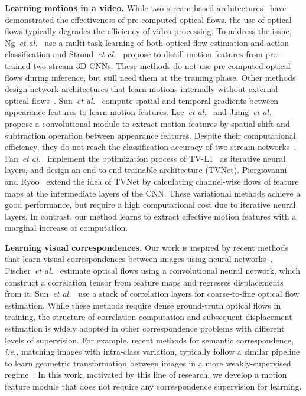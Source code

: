 \documentclass[runningheads]{llncs}
\def\ie{\emph{i.e.}}
\begin{document}
\smallbreak
\noindent
\textbf{Learning motions in a video.}
While two-stream-based architectures~\cite{simonyan2014two,feichtenhofer2016convolutional,feichtenhofer2016spatiotemporal,sevilla2018integration} have demonstrated the effectiveness of pre-computed optical flows, the use of optical flows typically degrades the efficiency of video processing.
To address the issue, Ng~\emph{et al.}~\cite{ng2018actionflownet} use a multi-task learning of both optical flow estimation and action classification and Stroud~\emph{et al.}~\cite{stroud2020d3d} propose to distill motion features from pre-trained two-stream 3D CNNs.
These methods do not use pre-computed optical flows during inference, but still need them at the training phase.
Other methods design network architectures that learn motions internally without external optical flows~\cite{sun2018optical,jiang2019stm,lee2018motion,fan2018end,piergiovanni2019representation}.
Sun~\emph{et al.}~\cite{sun2018optical} compute spatial and temporal gradients between appearance features to learn motion features.
Lee~\emph{et al.}~\cite{lee2018motion} and Jiang~\emph{et al.}~\cite{jiang2019stm} propose a convolutional module to extract motion features by spatial shift and subtraction operation between appearance features.
Despite their computational efficiency, they do not reach the classification accuracy of two-stream networks~\cite{simonyan2014two}.
Fan~\emph{et al.}~\cite{fan2018end} implement the optimization process of TV-L1~\cite{zach2007duality} as iterative neural layers, and design an end-to-end trainable architecture (TVNet).
Piergiovanni and Ryoo~\cite{piergiovanni2019representation} extend the idea of TVNet by calculating channel-wise flows of feature maps at the intermediate layers of the CNN.
These variational methods achieve a good performance, but require a high computational cost due to iterative neural layers.
In contrast, our method learns to extract effective motion features with a marginal increase of computation.

\smallbreak
\noindent
\textbf{Learning visual correspondences.}
Our work is inspired by recent methods that learn visual correspondences between images using neural networks~\cite{han2017scnet,dosovitskiy2015flownet,rocco2017convolutional,min2019hyperpixel,lee2019sfnet,sun2018pwc}.
Fischer~\emph{et al.}~\cite{dosovitskiy2015flownet} estimate optical flows using a convolutional neural network, which construct a correlation tensor from feature maps and regresses displacements from it. Sun~\emph{et al.}~\cite{sun2018pwc} use a stack of correlation layers for coarse-to-fine optical flow estimation.
While these methods require dense ground-truth optical flows in training, 
the structure of correlation computation and subsequent displacement estimation is widely adopted in other correspondence problems with different levels of supervision. For example, recent methods for semantic correspondence, \ie, matching images with intra-class variation, typically follow a similar pipeline to learn geometric transformation between images in a more weakly-supervised regime~\cite{han2017scnet,rocco2017convolutional,lee2019sfnet,min2019hyperpixel}. In this work, motivated by this line of research, we develop a motion feature module that does not require any correspondence supervision for learning.  
\end{document}
